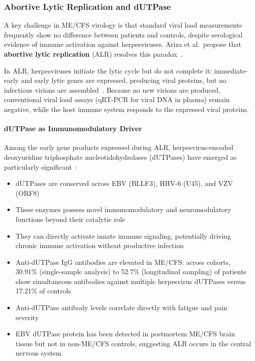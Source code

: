 \subsubsection{Abortive Lytic Replication and dUTPase}
\label{sec:abortive-lytic}

A key challenge in ME/CFS virology is that standard viral load measurements frequently show no difference between patients and controls, despite serological evidence of immune activation against herpesviruses. Ariza et al.\ propose that \textbf{abortive lytic replication} (ALR) resolves this paradox~\cite{Ariza2025polyherpesvirus}.

In ALR, herpesviruses initiate the lytic cycle but do not complete it: immediate-early and early lytic genes are expressed, producing viral proteins, but no infectious virions are assembled~\cite{Ariza2025polyherpesvirus}. Because no new virions are produced, conventional viral load assays (qRT-PCR for viral DNA in plasma) remain negative, while the host immune system responds to the expressed viral proteins.

\paragraph{dUTPase as Immunomodulatory Driver}
Among the early gene products expressed during ALR, herpesvirus-encoded deoxyuridine triphosphate nucleotidohydrolases (dUTPases) have emerged as particularly significant~\cite{Ariza2025polyherpesvirus, Palomo2026herpesvirus}:
\begin{itemize}
    \item dUTPases are conserved across EBV (BLLF3), HHV-6 (U45), and VZV (ORF8)
    \item These enzymes possess novel immunomodulatory and neuromodulatory functions beyond their catalytic role
    \item They can directly activate innate immune signaling, potentially driving chronic immune activation without productive infection
    \item Anti-dUTPase IgG antibodies are elevated in ME/CFS: across cohorts, 30.91\% (single-sample analysis) to 52.7\% (longitudinal sampling) of patients show simultaneous antibodies against multiple herpesvirus dUTPases versus 17.21\% of controls~\cite{Ariza2025polyherpesvirus}
    \item Anti-dUTPase antibody levels correlate directly with fatigue and pain severity~\cite{Palomo2026herpesvirus}
    \item EBV dUTPase protein has been detected in postmortem ME/CFS brain tissue but not in non-ME/CFS controls, suggesting ALR occurs in the central nervous system~\cite{Ariza2025polyherpesvirus}
\end{itemize}

